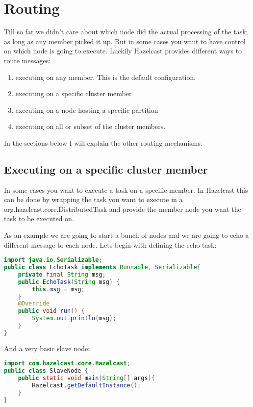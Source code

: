 \section{Routing}

Till so far we didn't care about which node did the actual processing of the task; as long as any member picked it up. But in some cases you want to have control on which node is going to execute. Luckily Hazelcast provides different ways to route messages:
\begin{enumerate}
\item executing on any member. This is the default configuration.
\item executing on a specific cluster member
\item executing on a node hosting a specific partition
\item executing on all or subset of the cluster members.
\end{enumerate}
In the sections below I will explain the other routing mechanisms.

\subsection{Executing on a specific cluster member}
In some cases you want to execute a task on a specific member. In Hazelcast this can be done by wrapping the task you want to execute in a org.hazelcast.core.DistributedTask and provide the member node you want the task to be executed on.

As an example we are going to start a bunch of nodes and we are going to echo a different message to each node. Lets begin with defining the echo task:

\begin{lstlisting}[language=java]
import java.io.Serializable;
public class EchoTask implements Runnable, Serializable{
    private final String msg;
    public EchoTask(String msg) {
        this.msg = msg;
    }
    @Override
    public void run() {
        System.out.println(msg);
    }
}
\end{lstlisting}

And a very basic slave node:
\begin{lstlisting}[language=java]
import com.hazelcast.core.Hazelcast;
public class SlaveNode {
    public static void main(String[] args){
        Hazelcast.getDefaultInstance();
    }
}
\end{lstlisting}

